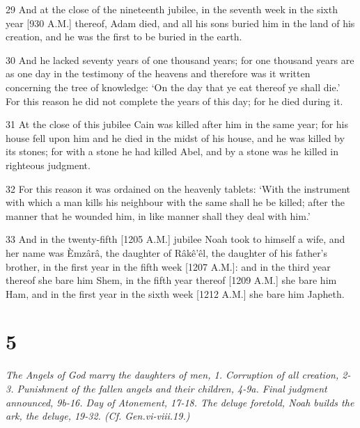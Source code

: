 \par 29 And at the close of the nineteenth jubilee, in the seventh week in the sixth year [930 A.M.] thereof, Adam died, and all his sons buried him in the land of his creation, and he was the first to be buried in the earth.
\par 30 And he lacked seventy years of one thousand years; for one thousand years are as one day in the testimony of the heavens and therefore was it written concerning the tree of knowledge: ‘On the day that ye eat thereof ye shall die.’ For this reason he did not complete the years of this day; for he died during it.
\par 31 At the close of this jubilee Cain was killed after him in the same year; for his house fell upon him and he died in the midst of his house, and he was killed by its stones; for with a stone he had killed Abel, and by a stone was he killed in righteous judgment.
\par 32 For this reason it was ordained on the heavenly tablets: ‘With the instrument with which a man kills his neighbour with the same shall he be killed; after the manner that he wounded him, in like manner shall they deal with him.’
\par 33 And in the twenty-fifth [1205 A.M.] jubilee Noah took to himself a wife, and her name was \`Emzârâ, the daughter of Râkê'êl, the daughter of his father's brother, in the first year in the fifth week [1207 A.M.]: and in the third year thereof she bare him Shem, in the fifth year thereof [1209 A.M.] she bare him Ham, and in the first year in the sixth week [1212 A.M.] she bare him Japheth.

\chapter{5}

\par \textit{The Angels of God marry the daughters of men, 1. Corruption of all creation, 2-3. Punishment of the fallen angels and their children, 4-9a. Final judgment announced, 9b-16. Day of Atonement, 17-18. The deluge foretold, Noah builds the ark, the deluge, 19-32. (Cf. Gen.vi-viii.19.)}

